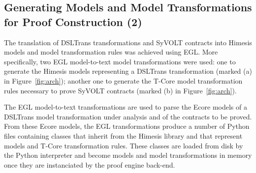 \subsection{Generating Models and Model Transformations for Proof Construction
(2)}
\label{sec:gen_models_mt}

The translation of DSLTrans transformations and SyVOLT contracts into Himesis
models and model transformation rules was achieved using EGL. More specifically, two EGL model-to-text model
transformations were used: one to generate the Himesis models
representing a DSLTrans transformation (marked (a) in Figure~\ref{fig:arch});
another one to generate the T-Core model transformation rules necessary to prove
SyVOLT contracts (marked (b) in Figure~\ref{fig:arch}).

The EGL model-to-text transformations are used to parse the Ecore models of a
DSLTrans model transformation under analysis and of the contracts to be proved.
From these Ecore models, the EGL transformations produce a number of Python
files containing classes that inherit from the Himesis library and that
represent models and T-Core transformation rules. These classes are loaded from
disk by the Python interpreter and become models and model transformations in
memory once they are instanciated by the proof engine back-end.




